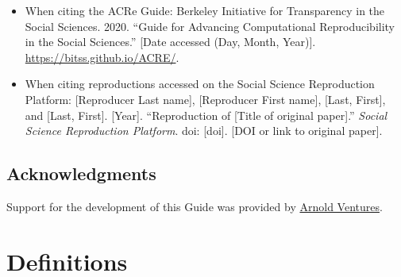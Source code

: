 \documentclass[
  openany]{book}
\providecommand{\tightlist}{%
  \setlength{\itemsep}{0pt}\setlength{\parskip}{0pt}}
\begin{document}
\begin{itemize}
\tightlist
\item
  When citing the ACRe Guide: Berkeley Initiative for Transparency in the Social Sciences. 2020. ``Guide for Advancing Computational Reproducibility in the Social Sciences.'' {[}Date accessed (Day, Month, Year){]}. \url{https://bitss.github.io/ACRE/}.\\
\item
  When citing reproductions accessed on the Social Science Reproduction Platform: {[}Reproducer Last name{]}, {[}Reproducer First name{]}, {[}Last, First{]}, and {[}Last, First{]}. {[}Year{]}. ``Reproduction of {[}Title of original paper{]}.'' \emph{Social Science Reproduction Platform}. doi: {[}doi{]}. {[}DOI or link to original paper{]}.
\end{itemize}

\hypertarget{acknowledgments}{%
\section{Acknowledgments}\label{acknowledgments}}

Support for the development of this Guide was provided by \href{https://www.arnoldventures.org/}{Arnold Ventures}.

\hypertarget{definitions}{%
\chapter{Definitions}\label{definitions}}
\end{document}
